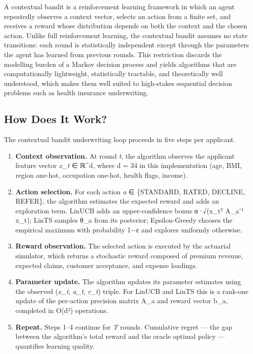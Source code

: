 A contextual bandit is a reinforcement learning framework in which an agent repeatedly observes a context vector, selects an action from a finite set, and receives a reward whose distribution depends on both the context and the chosen action. Unlike full reinforcement learning, the contextual bandit assumes no state transitions: each round is statistically independent except through the parameters the agent has learned from previous rounds. This restriction discards the modelling burden of a Markov decision process and yields algorithms that are computationally lightweight, statistically tractable, and theoretically well understood, which makes them well suited to high-stakes sequential decision problems such as health insurance underwriting.

\subsection{How Does It Work?}\label{how-does-it-work}

The contextual bandit underwriting loop proceeds in five steps per applicant.

\begin{enumerate}
\def\labelenumi{\arabic{enumi}.}
\tightlist
\item
  \textbf{Context observation.} At round \emph{t}, the algorithm observes the applicant feature vector \emph{x\_t} ∈ ℝ\^{}d, where d = 34 in this implementation (age, BMI, region one-hot, occupation one-hot, health flags, income).
\item
  \textbf{Action selection.} For each action \emph{a} ∈ \{STANDARD, RATED, DECLINE, REFER\}, the algorithm estimates the expected reward and adds an exploration term. LinUCB adds an upper-confidence bonus α·√(x\_tᵀ A\_a⁻¹ x\_t); LinTS samples θ\_a from its posterior; Epsilon-Greedy chooses the empirical maximum with probability 1−ε and explores uniformly otherwise.
\item
  \textbf{Reward observation.} The selected action is executed by the actuarial simulator, which returns a stochastic reward composed of premium revenue, expected claims, customer acceptance, and expense loadings.
\item
  \textbf{Parameter update.} The algorithm updates its parameter estimates using the observed (\emph{x\_t}, \emph{a\_t}, \emph{r\_t}) triple. For LinUCB and LinTS this is a rank-one update of the per-action precision matrix A\_a and reward vector b\_a, completed in O(d²) operations.
\item
  \textbf{Repeat.} Steps 1--4 continue for \emph{T} rounds. Cumulative regret --- the gap between the algorithm's total reward and the oracle optimal policy --- quantifies learning quality.
\end{enumerate}

